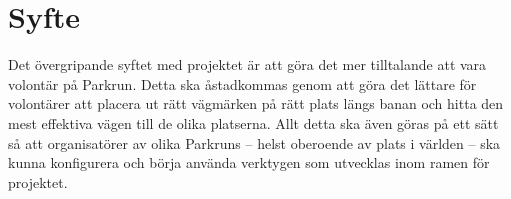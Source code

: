 \section{Syfte}
Det övergripande syftet med projektet är att göra det mer tilltalande att vara volontär på Parkrun. 
Detta ska åstadkommas genom att göra det lättare för volontärer att placera ut rätt vägmärken på rätt plats längs banan och hitta den mest effektiva vägen till de olika platserna.
Allt detta ska även göras på ett sätt så att organisatörer av olika Parkruns -- helst oberoende av plats i världen -- ska kunna konfigurera och börja använda verktygen som utvecklas inom ramen för projektet.